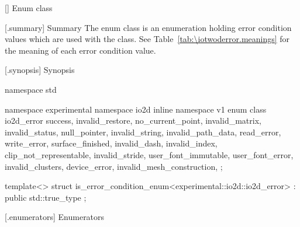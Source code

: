  [\iotwoderror] {Enum class }

 [\iotwoderror.summary] { Summary}
\pnum
The  enum class is an enumeration holding error condition values which are used with the  class. See 
Table~\ref{tab:\iotwoderror.meanings} for the meaning of each
error condition value.

 [\iotwoderror.synopsis] { Synopsis}

\begin{codeblock}
namespace std { namespace experimental { namespace io2d { inline namespace v1 {
  enum class io2d_error {
    success,
    invalid_restore,
    no_current_point,
    invalid_matrix,
    invalid_status,
    null_pointer,
    invalid_string,
    invalid_path_data,
    read_error,
    write_error,
    surface_finished,
    invalid_dash,
    invalid_index,
    clip_not_representable,
    invalid_stride,
    user_font_immutable,
    user_font_error,
    invalid_clusters,
    device_error,
    invalid_mesh_construction,
  };
} } }

  template<>
  struct is_error_condition_enum<experimental::io2d::io2d_error>
  : public std::true_type{ };
}
\end{codeblock}

 [\iotwoderror.enumerators] { Enumerators}

